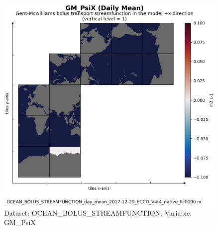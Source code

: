 \begin{figure}[H]
\centering
\includegraphics[scale=0.55]{../images/plots/v4r4/native_plots/Gent-McWilliams_Bolus_Transport_Streamfunction/GM_PsiX.png}
\caption{Dataset: OCEAN\_BOLUS\_STREAMFUNCTION, Variable: GM\_PsiX}
\label{tab:table-OCEAN_BOLUS_STREAMFUNCTION_GM_PsiX-Plot}
\end{figure}
\newpage
\pagebreak
